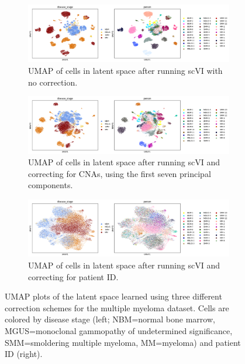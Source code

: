 \documentclass{article}
\begin{document}
\begin{figure}[h]
     \centering
     \begin{subfigure}[b]{\textwidth}
         \centering
         \includegraphics[width=\textwidth]{figures/umap_scvi_seed1_clinicalcovars2.png}
         \caption{UMAP of cells in latent space after running scVI with no correction.}
         \label{fig:vanillascvi_umap}
     \end{subfigure}
     \hfill
     \begin{subfigure}[b]{\textwidth}
         \centering
         \includegraphics[width=\textwidth]{figures/umap_scvi_CNVcont_seed1_clinicalcovars2.png}
         \caption{UMAP of cells in latent space after running scVI and correcting for CNAs, using the first seven principal components.}
         \label{fig:cnv_umap}
     \end{subfigure}
          \hfill
     \begin{subfigure}[b]{\textwidth}
         \centering
         \includegraphics[width=\textwidth]{figures/umap_scvi_batchperson_seed1_clinicalcovars2.png}
         \caption{UMAP of cells in latent space after running scVI and correcting for patient ID.}
         \label{fig:pid_umap}
     \end{subfigure}
        \caption{UMAP plots of the latent space learned using three different correction schemes for the multiple myeloma dataset. Cells are colored by disease stage (left; NBM=normal bone marrow, MGUS=monoclonal gammopathy of undetermined significance, SMM=smoldering multiple myeloma, MM=myeloma) and patient ID (right).}
        \label{fig:umaps_clinical}
\end{figure}
\end{document}

